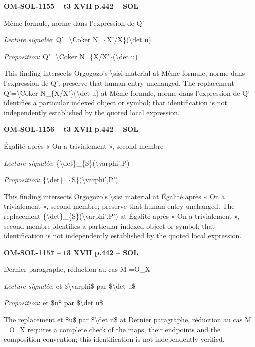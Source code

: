\par\noindent\textbf{OM-SOL-1155 -- t3 XVII p.442 -- SOL}\par
Même formule, norme dans l'expression de Q'\par
\emph{Lecture signalée}: Q'=\allowbreak \textbackslash{}Coker N\_\{X'/X\}(\textbackslash{}det u)\par
\emph{Proposition}: Q'=\allowbreak \textbackslash{}Coker N\_\{X/X'\}(\textbackslash{}det u)\par
This finding intersects Orgogozo's \textbackslash{}sisi material at Même formule, norme dans l'expression de Q'; preserve that human entry unchanged. The replacement Q'=\allowbreak \textbackslash{}Coker N\_\{X/X'\}(\textbackslash{}det u) at Même formule, norme dans l'expression de Q' identifies a particular indexed object or symbol; that identification is not independently established by the quoted local expression.\par
\par\noindent\textbf{OM-SOL-1156 -- t3 XVII p.442 -- SOL}\par
Égalité après « On a trivialement », second membre\par
\emph{Lecture signalée}: \{\textbackslash{}det\}\_\{S\}(\textbackslash{}varphi',P)\par
\emph{Proposition}: \{\textbackslash{}det\}\_\{S\}(\textbackslash{}varphi',P')\par
This finding intersects Orgogozo's \textbackslash{}sisi material at Égalité après « On a trivialement », second membre; preserve that human entry unchanged. The replacement \{\textbackslash{}det\}\_\{S\}(\textbackslash{}varphi',P') at Égalité après « On a trivialement », second membre identifies a particular indexed object or symbol; that identification is not independently established by the quoted local expression.\par
\par\noindent\textbf{OM-SOL-1157 -- t3 XVII p.442 -- SOL}\par
Dernier paragraphe, réduction au cas M =\allowbreak  O\_X\par
\emph{Lecture signalée}: et \$\textbackslash{}varphi\$ par \$\textbackslash{}det u\$\par
\emph{Proposition}: et \$u\$ par \$\textbackslash{}det u\$\par
The replacement et \$u\$ par \$\textbackslash{}det u\$ at Dernier paragraphe, réduction au cas M =\allowbreak  O\_X requires a complete check of the maps, their endpoints and the composition convention; this identification is not independently verified.\par
